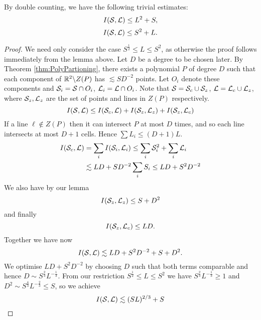 \begin{lemma} 
    By double counting, we have the following trivial estimates:
    $$
    I(\mathcal S, \mathcal L) \leq L^2 + S,
    $$
    $$
    I(\mathcal S, \mathcal L) \leq S^2 + L.
    $$
    
    
\end{lemma}
\begin{proof}
We need only consider the case $S^{\frac{1}{2}} \leq L \leq S^2$, as otherwise the proof follows immediately from the lemma above. Let $D$ be a degree to be chosen later. By Theorem \ref{thm:PolyPartioning}, there
exists a polynomial $P$ of degree $D$ such that each component of $\mathbb R^2 \backslash Z(P)$ has $\lesssim SD^{-2}$ points. Let $O_i$ denote these components and $\mathcal S_i = \mathcal S \cap O_i$, $\mathcal L_i = \mathcal L \cap O_i$. 
Note that $\mathcal S = \mathcal S_c \cup \mathcal S_z$, $\mathcal L = \mathcal L_c \cup \mathcal L_z$, where $\mathcal S_z, \mathcal L_z$ are the set of points and lines in $Z(P)$ respectively.
$$I(\mathcal S, \mathcal L) \leq I(\mathcal S_c, \mathcal L) + I(\mathcal S_z, \mathcal L_z) + I(\mathcal S_z, \mathcal L_c)$$
If a line $\ell \notin Z(P)$ then it can intersect $P$ at most $D$ times, and so each line intersects at most $D+1$ cells. Hence $\sum L_i \leq (D+1)L$.
\begin{align*}
    I(\mathcal S_c, \mathcal L) &= \sum_i I(\mathcal S_i, \mathcal L_i) \leq \sum_i \mathcal S_i^2 + \sum_i \mathcal L_i\\
    &\lesssim LD + SD^{-2} \sum_i S_i \leq LD + S^2D^{-2}
\end{align*} 
We also have by our lemma
$$I(\mathcal S_z, \mathcal L_z) \leq S + D^2$$
and finally $$I(\mathcal S_z, \mathcal L_c) \leq LD.$$
Together we have now 
$$I(\mathcal S, \mathcal L) \lesssim LD + S^2D^{-2} +S + D^2.$$
We optimise $LD + S^2D^{-2}$ by choosing $D$ such that both terms comparable and hence $D \sim S^{\frac{2}{3}} L^{-\frac{1}{3}}$. 
From our restriction $S^{\frac{1}{2}} \leq L \leq S^2$ we have $S^{\frac{2}{3}} L^{-\frac{1}{3}} \geq 1$
and $D^2 \sim S^{\frac{4}{3}} L^{-\frac{2}{3}} \leq S$, so we achieve
$$I(\mathcal S, \mathcal L) \lesssim (SL)^{2/3} + S $$
\end{proof}